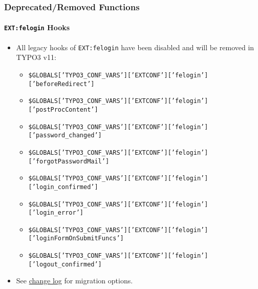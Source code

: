 \begin{frame}[fragile]
	\frametitle{Deprecated/Removed Functions}
	\framesubtitle{\texttt{EXT:felogin} Hooks}

	\lstset{basicstyle=\tiny\ttfamily}

	\begin{itemize}
		\item All legacy hooks of \texttt{EXT:felogin} have been disabled and
			will be removed in TYPO3 v11:

			\begin{itemize}\tiny
				\item \texttt{\$GLOBALS['TYPO3\_CONF\_VARS']['EXTCONF']['felogin']['beforeRedirect']}
				\item \texttt{\$GLOBALS['TYPO3\_CONF\_VARS']['EXTCONF']['felogin']['postProcContent']}
				\item \texttt{\$GLOBALS['TYPO3\_CONF\_VARS']['EXTCONF']['felogin']['password\_changed']}
				\item \texttt{\$GLOBALS['TYPO3\_CONF\_VARS']['EXTCONF']['felogin']['forgotPasswordMail']}
				\item \texttt{\$GLOBALS['TYPO3\_CONF\_VARS']['EXTCONF']['felogin']['login\_confirmed']}
				\item \texttt{\$GLOBALS['TYPO3\_CONF\_VARS']['EXTCONF']['felogin']['login\_error']}
				\item \texttt{\$GLOBALS['TYPO3\_CONF\_VARS']['EXTCONF']['felogin']['loginFormOnSubmitFuncs']}
				\item \texttt{\$GLOBALS['TYPO3\_CONF\_VARS']['EXTCONF']['felogin']['logout\_confirmed']}
			\end{itemize}

		\item See
			\href{https://docs.typo3.org/c/typo3/cms-core/master/en-us/Changelog/10.4/Deprecation-88740-DeprecateFeloginPibasePlugin.html}{change log}
			for migration options.
	\end{itemize}

\end{frame}

